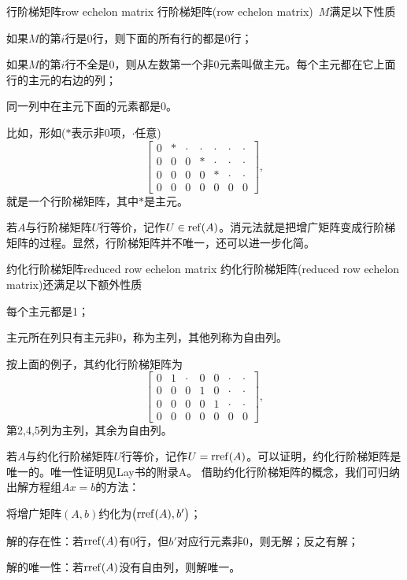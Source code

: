 \begin{definition}{行阶梯矩阵}{row echelon matrix}
	行阶梯矩阵(row echelon matrix)~$M$满足以下性质
	\begin{compactitem}
		\item 如果$M$的第$i$行是0行，则下面的所有行的都是0行；
		\item 如果$M$的第$i$行不全是0，则从左数第一个非0元素叫做主元。每个主元都在它上面行的主元的右边的列；
		\item 同一列中在主元下面的元素都是0。
	\end{compactitem}
	比如，形如($\ast$表示非0项，$\cdot$任意)
	\[
		\begin{bmatrix}
			0&\ast&\cdot&\cdot&\cdot&\cdot&\cdot\\
			0&0&0&\ast&\cdot&\cdot&\cdot\\
			0&0&0&0&\ast&\cdot&\cdot\\
			0&0&0&0&0&0&0
		\end{bmatrix},
	\]
	就是一个行阶梯矩阵，其中$\ast$是主元。
\end{definition}
若$A$与行阶梯矩阵$U$行等价，记作$U\in\operatorname{ref}(A)$。消元法就是把增广矩阵变成行阶梯矩阵的过程。显然，行阶梯矩阵并不唯一，还可以进一步化简。
\begin{definition}{约化行阶梯矩阵}{reduced row echelon matrix}
	约化行阶梯矩阵(reduced row echelon matrix)还满足以下额外性质
	\begin{compactitem}
		\item 每个主元都是1；
		\item 主元所在列只有主元非0，称为主列，其他列称为自由列。
	\end{compactitem}
	按上面的例子，其约化行阶梯矩阵为
	\[
		\begin{bmatrix}
			0&1&\cdot&0&0&\cdot&\cdot\\
			0&0&0&1&0&\cdot&\cdot\\
			0&0&0&0&1&\cdot&\cdot\\
			0&0&0&0&0&0&0
		\end{bmatrix},
	\]
	第2,4,5列为主列，其余为自由列。
\end{definition}
若$A$与约化行阶梯矩阵$U$行等价，记作$U=\operatorname{rref}(A)$。可以证明，约化行阶梯矩阵是唯一的。唯一性证明见Lay书的附录A。
借助约化行阶梯矩阵的概念，我们可归纳出解方程组$Ax=b$的方法：
\begin{compactitem}
	\item 将增广矩阵$(A,b)$约化为$\bigl(\operatorname{rref}(A),b'\bigr)$；
	\item 解的存在性：若$\operatorname{rref}(A)$有0行，但$b'$对应行元素非0，则无解；反之有解；
	\item 解的唯一性：若$\operatorname{rref}(A)$没有自由列，则解唯一。
\end{compactitem}
